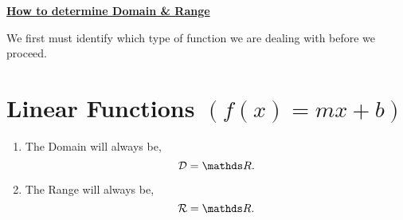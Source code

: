 \documentclass[12pt]{article} %
\begin{document}
	\renewcommand*{\coursecode}{MATH 235} %
	\renewcommand*{\assgnnumber}{Assignment 1} %
	\renewcommand*{\submdate}{September 14, 2021} %
	\renewcommand*{\studentfname}{Abdullah} %
	\renewcommand*{\studentlname}{Zubair} %
    \renewcommand*{\proofname}{Proof:}

	\renewcommand\qedsymbol{$\blacksquare$}
	\setfigpath
	\fancyhfoffset[L,O]{0pt} %




\begin{center}
  \underline{\textbf{\Huge{How to determine Domain \& Range}}}
\end{center}

	\vspace*{0.5cm}
  We first must identify which type of function we are dealing with before we proceed.
  \section{Linear Functions $(f(x) = mx + b)$}
  \begin{enumerate}
    \item The Domain will always be,
      \[
            \mathcal{D} = \R
      .\] 
    \item The Range will always be,
      \[
            \mathcal{R} = \R
      .\] 
  \end{enumerate}
\end{document}
